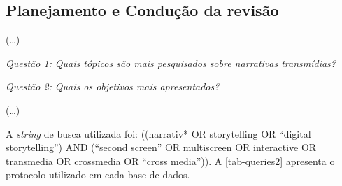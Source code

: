 \documentclass[
article,			%
11pt,				%
oneside,			%
a4paper,			%
english,			%
brazil,				%
sumario=tradicional
]{abntex2}
\begin{document}
  \subsection{Planejamento e Condução da revisão}

  (\ldots)

  \emph{Questão 1: Quais tópicos são mais pesquisados sobre narrativas transmídias?}

  \emph{Questão 2: Quais os objetivos mais apresentados?}


  (\ldots)

  A \textit{string} de busca utilizada foi: ((narrativ* OR storytelling OR ``digital storytelling'') AND (``second screen'' OR multiscreen OR interactive OR transmedia OR crossmedia OR ``cross media'')). A \autoref{tab-queries2} apresenta o protocolo utilizado em cada base de dados.
\end{document}

